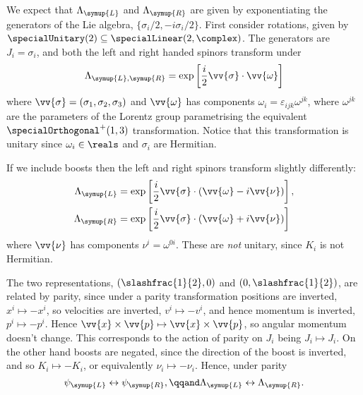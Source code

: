 \documentclass[fleqn]{NotesClass}
\newcommand{\Left}{\symup{L}}
\newcommand{\Right}{\symup{R}}
\begin{document}
    We expect that \(\Lambda_{\Left}\) and \(\Lambda_{\Right}\) are given by exponentiating the generators of the Lie algebra, \(\{\sigma_i/2, -i\sigma_i/2\}\).
    First consider rotations, given by \(\specialUnitary(2) \subseteq \specialLinear(2, \complex)\).
    The generators are \(J_i = \sigma_i\), and both the left and right handed spinors transform under
    \begin{equation}
        \Lambda_{\Left, \Right} = \exp\left[ \frac{i}{2} \vv{\sigma} \cdot \vv{\omega} \right]
    \end{equation}
    where \(\vv{\sigma} = (\sigma_1, \sigma_2, \sigma_3)\) and \(\vv{\omega}\) has components \(\omega_i  = \varepsilon_{ijk} \omega^{jk}\), where \(\omega^{jk}\) are the parameters of the Lorentz group parametrising the equivalent \(\specialOrthogonal^+(1, 3)\) transformation.
    Notice that this transformation is unitary since \(\omega_i \in \reals\) and \(\sigma_i\) are Hermitian.
    
    If we include boosts then the left and right spinors transform slightly differently:
    \begin{align}
        \Lambda_{\Left} &= \exp\left[ \frac{i}{2} \vv{\sigma} \cdot (\vv{\omega} - i\vv{\nu}) \right],\\
        \Lambda_{\Right} &= \exp\left[ \frac{i}{2} \vv{\sigma} \cdot (\vv{\omega} + i\vv{\nu}) \right]
    \end{align}
    where \(\vv{\nu}\) has components \(\nu^i = \omega^{0i}\).
    These are \emph{not} unitary, since \(K_i\) is not Hermitian.
    
    The two representations, \((\slashfrac{1}{2}, 0)\) and \((0, \slashfrac{1}{2})\), are related by parity, since under a parity transformation positions are inverted, \(x^i \mapsto -x^i\), so velocities are inverted, \(v^i \mapsto -v^i\), and hence momentum is inverted, \(p^i \mapsto -p^i\).
    Hence \(\vv{x} \times \vv{p} \mapsto \vv{x} \times \vv{p}\), so angular momentum doesn't change.
    This corresponds to the action of parity on \(J_i\) being \(J_i \mapsto J_i\).
    On the other hand boosts are negated, since the direction of the boost is inverted, and so \(K_i \mapsto -K_i\), or equivalently \(\nu_i \mapsto -\nu_i\).
    Hence, under parity
    \begin{equation}
        \psi_{\Left} \leftrightarrow \psi_{\Right}, \qqand \Lambda_{\Left} \leftrightarrow \Lambda_{\Right}.
    \end{equation}
    
\end{document}
